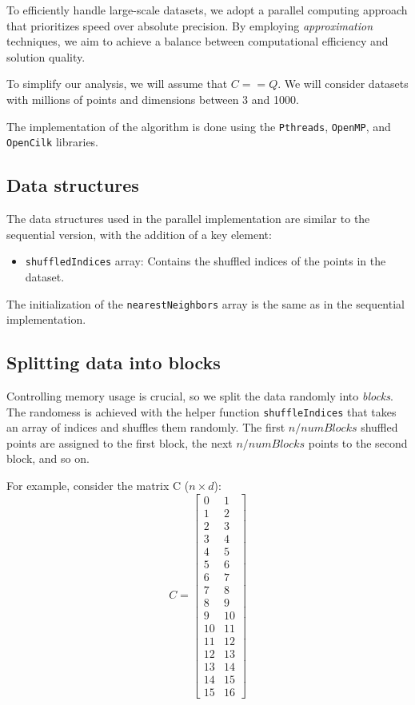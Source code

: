 \documentclass{article}
\begin{document}
To efficiently handle large-scale datasets, we adopt a parallel computing approach that prioritizes speed over absolute precision. 
By employing \emph{approximation} techniques, we aim to achieve a balance between computational efficiency and solution quality.

To simplify our analysis, we will assume that $C==Q$. We will consider datasets with millions of points and dimensions between 3 and 1000.

The implementation of the algorithm is done using the \texttt{Pthreads}, \texttt{OpenMP}, and \texttt{OpenCilk} libraries.

\subsection{Data structures}
The data structures used in the parallel implementation are similar to the sequential version, with the addition of a key element:
\begin{itemize}
    \item \texttt{shuffledIndices} array: Contains the shuffled indices of the points in the dataset.
    
\end{itemize}

The initialization of the \texttt{nearestNeighbors} array is the same as in the sequential implementation.

\subsection{Splitting data into blocks}
Controlling memory usage is crucial, so we split the data randomly into \emph{blocks}. The randomess is achieved with the helper 
function \texttt{shuffleIndices} that takes an array of indices and shuffles them randomly. The first $n / numBlocks$ shuffled
points are assigned to the first block, the next $n / numBlocks$ points to the second block, and so on.

For example, consider the matrix C ($n \times d$):
\[
C = \begin{bmatrix}
0 & 1 \\
1 & 2 \\
2 & 3 \\
3 & 4 \\
4 & 5 \\
5 & 6 \\
6 & 7 \\
7 & 8 \\
8 & 9 \\
9 & 10 \\
10 & 11 \\
11 & 12 \\
12 & 13 \\
13 & 14 \\
14 & 15 \\
15 & 16
\end{bmatrix}
\]
\end{document}
